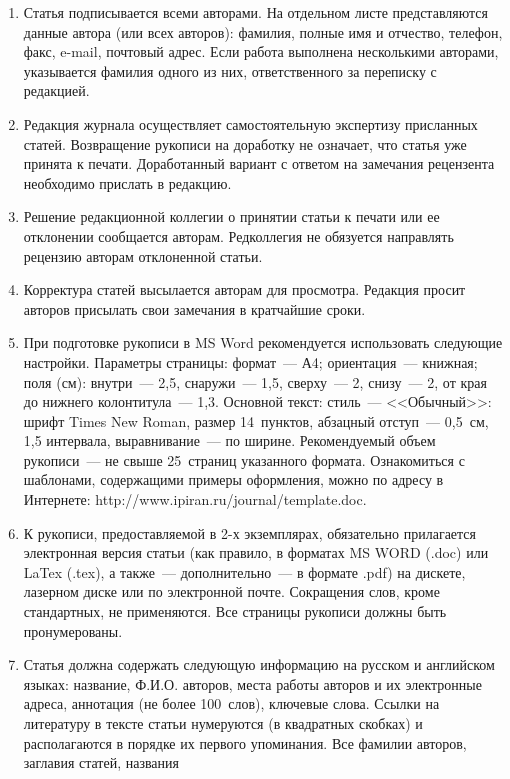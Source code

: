 {{\begin{enumerate}
Редколлегия вправе запросить у авторов экспертное заключение о возможности
опубликования представленной статьи в открытой печати.
\item Статья
подписывается всеми авторами. На отдельном листе представляются данные автора
(или всех авторов): фамилия, полные имя и отчество, телефон, факс, e-mail,
почтовый адрес. Если работа выполнена несколькими авторами, указывается фамилия
одного из них, ответственного за переписку с редакцией.
\item Редакция журнала
осуществляет самостоятельную экспертизу присланных статей. Возвращение рукописи
на доработку не означает, что статья уже принята к печати. Доработанный вариант
с ответом на замечания рецензента необходимо прислать в редакцию.
\item Решение
редакционной коллегии о принятии статьи к печати или ее отклонении сообщается
авторам. Редколлегия не обязуется направлять рецензию авторам отклоненной
статьи.
\item Корректура статей высылается авторам для просмотра. Редакция
просит авторов присылать свои замечания в кратчайшие сроки.
\item При
подготовке рукописи в MS Word рекомендуется использовать следующие настройки.
Параметры страницы: формат~--- А4; ориентация~--- книжная; поля (см): внутри~---
2,5, снаружи~--- 1,5, сверху~--- 2, снизу~--- 2, от края до нижнего
колонтитула~--- 1,3. Основной текст: стиль~--- <<Обычный>>: шрифт Times New
Roman, размер 14~пунктов, абзацный отступ~--- 0,5~см, 1,5 интервала,
выравнивание~--- по ширине. Рекомендуемый объем рукописи~--- не свыше
25~страниц указанного формата. Ознакомиться с шаблонами, содержащими примеры
оформления, можно по адресу в Интернете:
\textsf{http://www.ipiran.ru/journal/template.doc}.
\item К рукописи, предоставляемой в 2-х
экземплярах, обязательно прилагается электронная версия статьи (как правило, в
форматах MS WORD (.doc) или LaTex (.tex), а также~--- дополнительно~--- в
формате .pdf) на дискете, лазерном диске или по электронной почте. Сокращения
слов, кроме стандартных, не применяются. Все страницы рукописи должны быть
пронумерованы.
\item Статья должна содержать следующую информацию на русском и
английском языках: название, Ф.И.О. авторов, места работы авторов и их
электронные адреса, аннотация (не более 100~слов), ключевые слова. Ссылки на
литературу в тексте статьи нумеруются (в квадратных скобках) и располагаются в
порядке их первого упоминания. Все фамилии авторов, заглавия статей, названия

\end{enumerate}}}

